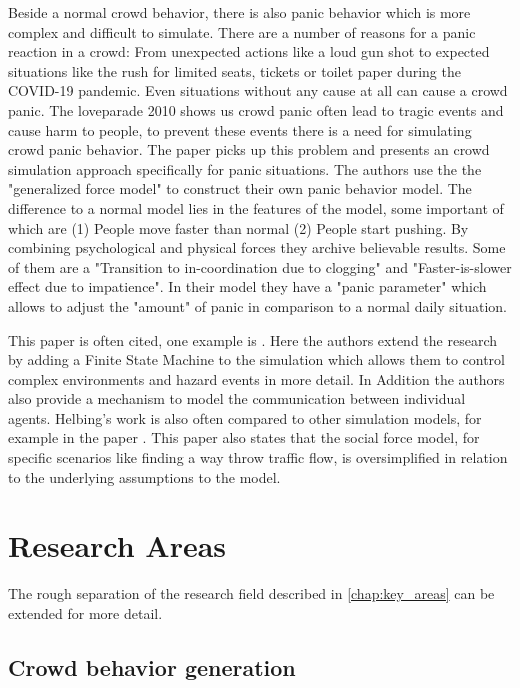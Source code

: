 \documentclass{acmsiggraph}               %
\begin{document}
Beside a normal crowd behavior, there is also panic behavior which is more complex and difficult to simulate. There are a number of reasons for a panic reaction in a crowd: From unexpected actions like a loud gun shot to expected situations like the rush for limited seats, tickets or toilet paper during the COVID-19 pandemic. Even situations without any cause at all can cause a crowd panic. The loveparade 2010 shows us crowd panic often lead to tragic events and cause harm to people, to prevent these events there is a need for simulating crowd panic behavior. 
The paper \cite{helbing_simulating_2000} picks up this problem and presents an crowd simulation approach specifically for panic situations. The authors use the the "generalized force model" \cite{hindsley_investigation_1986} to construct their own panic behavior model. The difference to a normal model lies in the features of the model, some important of which are (1) People move faster than normal (2) People start pushing. By combining psychological and physical forces they archive believable results. Some of them are a "Transition to in-coordination due to clogging" and "Faster-is-slower effect due to impatience". 
In their model they have a "panic parameter" \label{term:panicParameter} which allows to adjust the "amount" of panic in comparison to a normal daily situation. 

This paper is often cited, one example is \cite{braun_simulating_2005}\label{exp:braun2005}. Here the authors extend the research by adding a Finite State Machine to the simulation which allows them to control complex environments and hazard events in more detail. In Addition the authors also provide a mechanism to model the communication between individual agents. Helbing's work is also often compared to other simulation models, for example in the paper \cite{zheng_modeling_2009}. This paper also states that the social force model, for specific scenarios like finding a way throw traffic flow, is oversimplified in relation to the underlying assumptions to the model.

\section{Research Areas}
\label{chap:researchAreas}

The rough separation of the research field described in \ref{chap:key_areas} can be extended for more detail.

\subsection{Crowd behavior generation}
\end{document}
